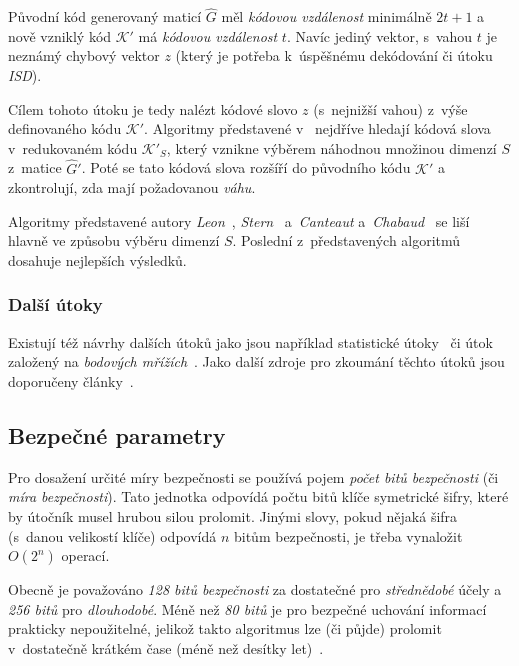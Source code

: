 \documentclass[thesis=M,czech,hidelinks]{FITthesis}[2012/06/26]
\newcommand{\0}{{\textcolor[gray]{0.80}{0}}}
\begin{document}
Původní kód generovaný maticí $\hat{G}$ měl \emph{kódovou vzdálenost} minimálně
$2t+1$ a nově vzniklý kód $\mathcal{K}'$ má \emph{kódovou vzdálenost} $t$. Navíc
jediný vektor, s~vahou $t$ je neznámý chybový vektor $z$ (který je potřeba
k~úspěšnému dekódování či útoku \emph{ISD}).

Cílem tohoto útoku je tedy nalézt kódové slovo $z$ (s~nejnižší vahou) z~výše
definovaného kódu $\mathcal{K}'$. Algoritmy představené
v~\cite{Leon,Stern,Canteaut} nejdříve hledají kódová slova v~redukovaném kódu
$\mathcal{K}'_S$, který vznikne výběrem náhodnou množinou dimenzí $S$ z~matice
$\hat{G}'$. Poté se tato kódová slova rozšíří do původního kódu $\mathcal{K}'$ a
zkontrolují, zda mají požadovanou \emph{váhu}.

Algoritmy představené autory \emph{Leon}~\cite{Leon}, \emph{Stern}~\cite{Stern}
a~\emph{Canteaut} a~\emph{Chabaud}~\cite{Canteaut} se liší hlavně ve způsobu
výběru dimenzí $S$. Poslední z~představených algoritmů dosahuje nejlepších
výsledků.


\subsubsection{Další útoky}
Existují též návrhy dalších útoků jako jsou například statistické
útoky~\cite{Jabri} či útok založený na \emph{bodových mřížích}~\cite{Brickell}.
Jako další zdroje pro zkoumání těchto útoků jsou doporučeny
články~\cite{Repka,Engelbert}.



\subsection{Bezpečné parametry}\label{kap_bezpecne_parametry}
Pro dosažení určité míry bezpečnosti se používá pojem \emph{počet bitů
bezpečnosti} (či \emph{míra bezpečnosti}). Tato jednotka odpovídá počtu bitů
klíče symetrické šifry, které by útočník musel hrubou silou prolomit. Jinými
slovy, pokud nějaká šifra (s~danou velikostí klíče) odpovídá $n$ bitům
bezpečnosti, je třeba vynaložit $O\left(2^n\right)$ operací.

Obecně je považováno \emph{128 bitů bezpečnosti} za dostatečné pro
\emph{střednědobé} účely a \emph{256 bitů} pro \emph{dlouhodobé}. Méně než \emph{80
bitů} je pro bezpečné uchování informací prakticky nepoužitelné, jelikož takto
 algoritmus lze (či půjde) prolomit v~dostatečně krátkém čase (méně
než desítky let)~\cite{Paar}.
\end{document}
